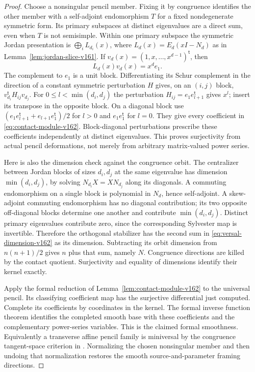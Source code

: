 \documentclass[11pt,reqno]{amsart}
\numberwithin{equation}{section}
\theoremstyle{definition}\newtheorem{definition}[theorem]{Definition}
\theoremstyle{remark}\newtheorem{remark}[theorem]{Remark}
\begin{document}
\begin{proof}
Choose a nonsingular pencil member. Fixing it by congruence identifies
the other member with a self-adjoint endomorphism $T$ for a fixed
nondegenerate symmetric form. Its primary subspaces at distinct
eigenvalues are a direct sum, even when $T$ is not semisimple.
Within one primary subspace the symmetric Jordan presentation is
$\bigoplus_i L_{d_i}(x)$, where
$L_d(x)=E_d(xI-N_d)$ as in Lemma~\ref{lem:jordan-slice-v161}.
If $v_d(x)=(1,x,\ldots,x^{d-1})^{\mathsf t}$, then
\begin{equation}\label{eq:kernel-vector-v162}
                  L_d(x)v_d(x)=x^d e_1.
\end{equation}
The complement to $e_1$ is a unit block. Differentiating its Schur
complement in the direction of a constant symmetric perturbation
$H$ gives, on an $(i,j)$ block,
$v_{d_i}^{\mathsf t}H_{ij}v_{d_j}$.
For $0\leq l<\min(d_i,d_j)$ the perturbation
$H_{ij}=e_1e_{l+1}^{\mathsf t}$ gives $x^l$; insert its transpose
in the opposite block. On a diagonal block use
$(e_1e_{l+1}^{\mathsf t}+e_{l+1}e_1^{\mathsf t})/2$ for $l>0$
and $e_1e_1^{\mathsf t}$ for $l=0$. They give every coefficient
in \eqref{eq:contact-module-v162}. Block-diagonal perturbations
prescribe these coefficients independently at distinct eigenvalues.
This proves surjectivity from actual pencil deformations, not merely
from arbitrary matrix-valued power series.

Here is also the dimension check against the congruence orbit.
The centralizer between Jordan blocks of sizes $d_i,d_j$ at the
same eigenvalue has dimension $\min(d_i,d_j)$, by solving
$N_{d_i}X=XN_{d_j}$ along its diagonals. A commuting endomorphism
on a single block is polynomial in $N_d$, hence self-adjoint.
A skew-adjoint commuting endomorphism has no diagonal contribution;
its two opposite off-diagonal blocks determine one another and
contribute $\min(d_i,d_j)$. Distinct primary eigenvalues contribute
zero, since the corresponding Sylvester map is invertible. Therefore
the orthogonal stabilizer has the second sum in
\eqref{eq:versal-dimension-v162} as its dimension. Subtracting its
orbit dimension from $n(n+1)/2$ gives $n$ plus that sum, namely $N$.
Congruence directions are killed by the contact quotient. Surjectivity
and equality of dimensions identify their kernel exactly.

Apply the formal reduction of Lemma~\ref{lem:contact-module-v162}
to the universal pencil. Its classifying coefficient map has the
surjective differential just computed. Complete its coefficients
by coordinates in the kernel. The formal inverse function theorem
identifies the completed smooth base with these coefficients and
the complementary power-series variables. This is the claimed formal
smoothness. Equivalently a transverse affine pencil family is
miniversal by the congruence tangent-space criterion in
\cite[Lemma~3.1]{Dmytryshyn162}. Normalizing the chosen nonsingular
member and then undoing that normalization restores the smooth
source-and-parameter framing directions.


\end{proof}
\end{document}
